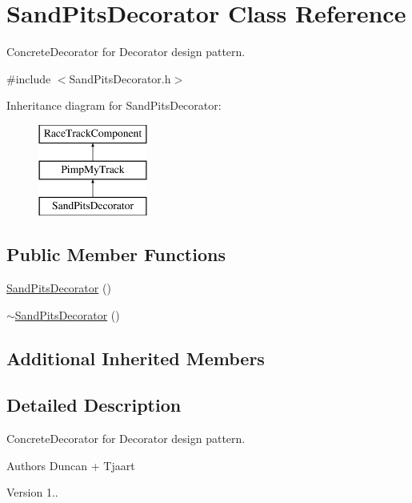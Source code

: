 \hypertarget{class_sand_pits_decorator}{}\section{Sand\+Pits\+Decorator Class Reference}
\label{class_sand_pits_decorator}


Concrete\+Decorator for Decorator design pattern.  




{\ttfamily \#include $<$Sand\+Pits\+Decorator.\+h$>$}

Inheritance diagram for Sand\+Pits\+Decorator\+:\begin{figure}[H]
\begin{center}
\leavevmode
\includegraphics[height=3.000000cm]{class_sand_pits_decorator}
\end{center}
\end{figure}
\subsection*{Public Member Functions}
\begin{DoxyCompactItemize}
\item 
\mbox{\hyperlink{class_sand_pits_decorator_ad4c404c58c44df9c10429f7d76672855}{Sand\+Pits\+Decorator}} ()
\item 
\mbox{\hyperlink{class_sand_pits_decorator_a7b4b725536eaeb7412cb8e12ef0e1dc3}{$\sim$\+Sand\+Pits\+Decorator}} ()
\end{DoxyCompactItemize}
\subsection*{Additional Inherited Members}


\subsection{Detailed Description}
Concrete\+Decorator for Decorator design pattern. 

\begin{DoxyAuthor}{Authors}
Duncan + Tjaart 
\end{DoxyAuthor}
\begin{DoxyVersion}{Version}
1.. 
\end{DoxyVersion}


